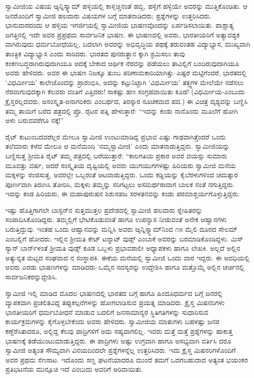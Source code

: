 ಸ್ವಾಮೀಜಿಯ ವಿಷಯ ಆ್ಯನ್ನಿಸ್ಕ್ವಾಮ್ ಹಳ್ಳಿಯಲ್ಲಿ ಕಾಳ್ಗಿಚ್ಚಿನಂತೆ ಹಬ್ಬಿ, ಹಳ್ಳಿಗೆ ಹಳ್ಳಿಯೇ ಅವರನ್ನು ಮುತ್ತಿಕೊಂಡಿತು. ಆ ಜನರೊಂದಿಗೆ ಸ್ವಾಮೀಜಿ ಹಲವಾರು ವಿಷಯಗಳ ಬಗ್ಗೆ ಮಾತನಾಡಿದರು; ಪ್ರಶ್ನೆಗಳನ್ನು ಉತ್ತರಿಸಿದರು. ಭಾನುವಾರದಂದು ಆ ಹಳ್ಳಿಯ ಇಗರ್ಜಿಯಲ್ಲಿ ಸ್ವಾಮೀಜಿಯ ಭಾಷಣವೊಂದನ್ನು ಏರ್ಪಡಿಸಲಾಯಿತು. ಪಾಶ್ಚಾತ್ಯ ಜಗತ್ತಿನಲ್ಲಿ ಇದೇ ಅವರ ಪ್ರಪ್ರಥಮ ಸಾರ್ವಜನಿಕ ಭಾಷಣ. ಈ ಭಾಷಣದಲ್ಲಿ ಅವರು, ಭಾರತೀಯರಿಗೆ ಅತ್ಯಾವಶ್ಯಕ ವಾಗಿರುವುದು ಧರ್ಮಬೋಧೆಯಲ್ಲ, ಬದಲಾಗಿ ಅವರನ್ನು ಅಭಿವೃದ್ಧಿಯ ಪಥಕ್ಕೆ ತರುವಂತಹ ವಿದ್ಯಾಭ್ಯಾಸ, ಮುಖ್ಯವಾಗಿ ತಾಂತ್ರಿಕ ವಿದ್ಯಾಭ್ಯಾಸ ಎಂದು ಸಾರಿದರು. ಭಾರತದ ಪುನರುತ್ಥಾನ ಕ್ಕಾಗಿ ಶ್ರಮಿಸಲು ತಾವು ಕಂಕಣಬದ್ಧರಾಗಿರುವುದಾಗಿಯೂ ಅದಕ್ಕೆ ಬೇಕಾದ ಆರ್ಥಿಕ ನೆರವನ್ನು ಪಡೆಯಲು ತಾವಿಲ್ಲಿಗೆ ಬಂದಿರುವುದಾಗಿಯೂ ಅವರು ಹೇಳಿದರು. ಅವರ ಈ ಭಾಷಣ ನಿಜಕ್ಕೂ ತುಂಬ ಪರಿಣಾಮಕಾರಿಯಾಗಿತ್ತು–ಎಷ್ಟರ ಮಟ್ಟಿಗೆಂದರೆ, ಭಾರತದಲ್ಲಿ ‘ವಿಧರ್ಮೀಯ’ ಕಾಲೇಜೊಂದನ್ನು ಪ್ರಾರಂಭಿಸಿ, ಅದನ್ನು ಕಟ್ಟುನಿಟ್ಟಾಗಿ ‘ವಿಧರ್ಮೀಯ’ ತತ್ತ್ವಗಳ ಮೇಲೆಯೇ ನಡೆಸಲು ನೆರವಾಗುವುದಕ್ಕಾಗಿ ಕೆಲವರು ವಂತಿಗೆ ಎತ್ತಿದರು! ಸಾಕಷ್ಟು ಹಣ ಸಂಗ್ರಹವಾಯಿತು ಕೂಡ! (ವಿಧರ್ಮೀಯ-ಎಂಬುದು ಕ್ರೈಸ್ತರಲ್ಲದವರು, ಅಸಂಸ್ಕೃತ-ಅನಾಗರಿಕರು ಎಂಬರ್ಥದ, ತಿರಸ್ಕಾರ ಸೂಚಕವಾದ ಪದ.) ಈ ವಿಚಿತ್ರ ದೃಶ್ಯವನ್ನು ಬಣ್ಣಿಸಿ ತಮ್ಮ ತಾಯಿಗೆ ಬರೆದ ಪತ್ರದಲ್ಲಿ ಪ್ರೊ. ರೈಟರ ಪತ್ನಿ ಹೇಳುತ್ತಾರೆ: “ಇದನ್ನು ಕಂಡು ನಾನೊಂದು ಮೂಲೆಗೆ ಹೋಗಿ ಅಳು ಬರುವವರೆಗೂ ನಕ್ಕೆ!”

ರೈಟ್ ಕುಟುಂಬದವರೆಲ್ಲರ ಮೇಲೂ ಸ್ವಾಮೀಜಿ ಉಂಟುಮಾಡಿದ್ದ ಪ್ರಭಾವ ಎಷ್ಟು ಗಾಢವಾಗಿತ್ತೆಂದರೆ ಒಂದು ತಲೆಮಾರು ಕಳೆದ ಮೇಲೂ ಆ ಮನೆಮಂದಿ ‘ನಮ್ಮಸ್ವಾಮೀಜಿ’ ಎಂದು ಮಾತನಾಡುತ್ತಿದ್ದರು. ಸ್ವಾಮೀಜಿಯನ್ನು ಬಣ್ಣಿಸುತ್ತ ಶ್ರೀಮತಿ ರೈಟ್ ತಮ್ಮ ಪತ್ರದಲ್ಲಿ ಬರೆಯುತ್ತಾರೆ: “ಕಾಲಗತಿಯ ಪ್ರಕಾರ ಅವರ ವಯಸ್ಸು ಸುಮಾರು ಮೂವತ್ತು ವರ್ಷ, ಆದರೆ ಸಂಸ್ಕೃತಿಯ ದೃಷ್ಟಿಯಲ್ಲಿ ಅವರು ಯುಗಯುಗಗಳಷ್ಟು ಹಿರಿಯರು ಸ್ವಾಮೀಜಿ ಮನೆಯ ಮಕ್ಕಳನ್ನು ರಂಜಿಸುತ್ತ, ಅವರಲ್ಲೇ ಒಬ್ಬರಂತೆ ಆಟವಾಡುತ್ತಿದ್ದರು. ಒಂದು ಕಡ್ಡಿಯನ್ನು ಕೈಬೆರಳುಗಳಿಂದ ಚಮತ್ಕಾರ ಪೂರ್ಣವಾಗಿ ತಿರುಗಿಸಿ ತೋರಿಸಿ, ಮಕ್ಕಳು ತಮ್ಮನ್ನು ಸರಿಗಟ್ಟಲು ಅಸಮರ್ಥರಾದಾಗ ಬಾಲಕ ನಂತೆ ನಗುತ್ತಿದ್ದರು. ಇದನ್ನು ಕಂಡ ಹಿರಿಯರು, ಈ ಮಹಾಪುರುಷನ ಶಿಶುಸಹಜ ಸರಳತನವನ್ನು ಕಂಡು ಪರಮಾಶ್ಚರ್ಯಗೊಳ್ಳುತ್ತಿದ್ದರು.

ಇಷ್ಟು ಹೊತ್ತಿಗಾಗಲೇ ಬಾಸ್ಟನ್​ನ ಸುತ್ತಮುತ್ತಲ ಪ್ರದೇಶದಲ್ಲಿ ಸ್ವಾಮೀಜಿ ಹಲವಾರು ಸ್ನೇಹಿತರನ್ನು ಸಂಪಾದಿಸಿಕೊಂಡಿದ್ದರು. ತಮ್ಮಲ್ಲಿಗೆ ಭೇಟಿಕೊಡುವಂತೆ ಹಾಗೂ ಉಪನ್ಯಾಸ ನೀಡುವಂತೆ ಅನೇಕ ಆಹ್ವಾನಗಳು ಬರುತ್ತಿದ್ದುವು. ಇಂತಹ ಒಂದು ಆಹ್ವಾನವನ್ನು ಮನ್ನಿಸಿ ಅವರು ಆ್ಯನ್ನಿಸ್ಕ್ವಾಮ್​ನಿಂದ ೧೫ ಮೈಲಿ ದೂರದ ಸೇಲಮ್ ಎಂಬಲ್ಲಿಗೆ ಹೋದರು. ಇಲ್ಲಿನ ಶ್ರೀಮತಿ ಕೇಟ್ ಟನ್ನಾಟ್ ವುಡ್ಸ್ ಎಂಬಾಕೆ ಅವರನ್ನು ಬರಮಾಡಿಕೊಂಡಿದ್ದಳು. ಮಿಸ್ ಸ್ಯಾನ್ ಬಾರ್ನ್​ಳಂತೆ ಶ್ರೀಮತಿ ವುಡ್ಸ್ ಕೂಡ ಒಬ್ಬಳು ಪ್ರಭಾವಶಾಲೀ ಅಧ್ಯಾಪಕಳು ಹಾಗೂ ಲೇಖಕಿ. ಅಲ್ಲದೆ ಅಲ್ಲಿನ ಅತ್ಯುನ್ನತ ಮಟ್ಟದ ಸಂಘವಾದ ನ ಸಂಸ್ಥಾಪಕಿ. ಈಕೆಯ ಮನೆಯಲ್ಲಿ ಸ್ವಾಮೀಜಿ ಒಂದು ವಾರ ಇದ್ದರು. ಈ ಅವಧಿಯಲ್ಲಿ ಅವರು ಎರಡು ಭಾಷಣಗಳನ್ನು ಮಾಡಿದರು–ಒಮ್ಮೆನ ಸದಸ್ಯರನ್ನು ಉದ್ದೇಶಿಸಿ ಹಾಗೂ ಮತ್ತೊಮ್ಮೆ ಅಲ್ಲಿನ ಚರ್ಚಿನಲ್ಲಿ ಸಾರ್ವಜನಿಕರನ್ನುದ್ದೇಶಿಸಿ.

ಸ್ವಾಮೀಜಿ ಇಲ್ಲಿ ಮಾಡಿದ ಮೊದಲ ಭಾಷಣದಲ್ಲಿ ಭಾರತದ ಬಗ್ಗೆ ಹಾಗೂ ಹಿಂದೂಧರ್ಮದ ಬಗ್ಗೆ ಜನರಲ್ಲಿ ವ್ಯಾಪಕವಾಗಿ ಪ್ರಚಲಿತವಿದ್ದ ತಪ್ಪುಕಲ್ಪನೆಗಳನ್ನು ಹೋಗಲಾಡಿಸುವ ಪ್ರಯತ್ನ ಮಾಡಿದರು. ಕ್ರೈಸ್ತ ಮಿಷನರಿಗಳು ಭಾರತೀಯರಿಗೆ ಧರ್ಮಬೋಧನೆ ಮಾಡುವ ಬದಲಿಗೆ ಜನಸಾಮಾನ್ಯರ ಸ್ಥಿತಿಗತಿಗಳನ್ನು ಸುಧಾರಿಸುವ ಕಾರ್ಯಕ್ರಮಗಳನ್ನು ಕೈಗೊಳ್ಳಬೇಕೆಂದು ಅವರು ಹೇಳಿದರು. ಸ್ವಾಮೀಜಿಯ ಮಾತುಗಳು ಬಹಳಷ್ಟು ಜನರ ಕಣ್ದೆರೆಸಿತಾದರೂ, ಅಲ್ಲಿದ್ದ ಕೆಲವು ಪಾದ್ರಿಗಳಿಗೆ ಅದು ಸಹ್ಯವಾಗಲಿಲ್ಲ. ಇವರು ಮತ್ತೆ ಮತ್ತೆ ಪ್ರಶ್ನೆಗಳನ್ನು ಹಾಕುತ್ತ ಭಾಷಣಕ್ಕೆ ತಡೆಯುಂಟುಮಾಡುತ್ತಿದ್ದರು. ಈ ಪಾದ್ರಿಗಳು ಅಷ್ಟು ಉಗ್ರವಾಗಿ ಹಾಗೂ ಅಸಭ್ಯವಾಗಿ ವರ್ತಿಸಿ ದರೂ ಸ್ವಾಮೀಜಿ ಅತ್ಯಂತ ಸೌಮ್ಯವಾಗಿ ವಿನಯದಿಂದಲೇ ಪ್ರಶ್ನೆಗಳನ್ನೆಲ್ಲ ಉತ್ತರಿಸಿದರು. ಇದು ಕ್ರೈಸ್ತ ಮಿಷನರಿಗಳೊಂದಿಗೆ ಅವರ ಪ್ರಥಮ ಸೆಣಸಾಟ. ಇದೊಂದು ಸಣ್ಣ ಘಟನೆಯಾದರೂ ಮುಂದೆ ತಮಗೆ ಒದಗಬಹುದಾದ ಅತ್ಯಂತ ಭಯಂಕರ ಪ್ರತಿಭಟನೆಯ ಮುನ್ಸೂಚಿ ಇದೆ ಎಂಬುದು ಅವರಿಗೆ ಅರಿವಾಯಿತು.


